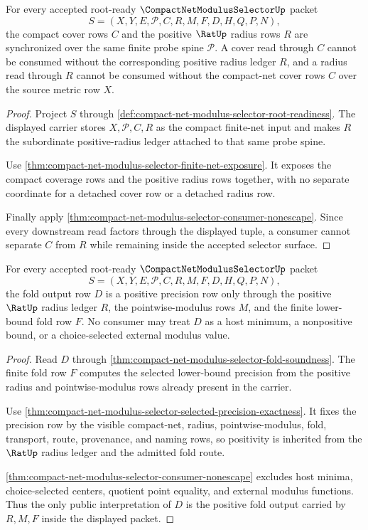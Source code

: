 \begin{theorem}
\label{thm:compact-net-modulus-selector-cover-radius-synchronization}
For every accepted root-ready $\CompactNetModulusSelectorUp$ packet
$$
S=(X,Y,E,\mathcal{P},C,R,M,F,D,H,Q,P,N),
$$
the compact cover rows $C$ and the positive $\RatUp$ radius rows $R$ are synchronized over the same finite probe spine $\mathcal{P}$. A cover read through $C$ cannot be consumed without the corresponding positive radius ledger $R$, and a radius read through $R$ cannot be consumed without the compact-net cover rows $C$ over the source metric row $X$.
\end{theorem}
\begin{proof}
Project $S$ through \autoref{def:compact-net-modulus-selector-root-readiness}. The displayed carrier stores $X,\mathcal{P},C,R$ as the compact finite-net input and makes $R$ the subordinate positive-radius ledger attached to that same probe spine.

Use \autoref{thm:compact-net-modulus-selector-finite-net-exposure}. It exposes the compact coverage rows and the positive radius rows together, with no separate coordinate for a detached cover row or a detached radius row.

Finally apply \autoref{thm:compact-net-modulus-selector-consumer-nonescape}. Since every downstream read factors through the displayed tuple, a consumer cannot separate $C$ from $R$ while remaining inside the accepted selector surface.
\end{proof}

\begin{theorem}
\label{thm:compact-net-modulus-selector-fold-output-positivity}
For every accepted root-ready $\CompactNetModulusSelectorUp$ packet
$$
S=(X,Y,E,\mathcal{P},C,R,M,F,D,H,Q,P,N),
$$
the fold output row $D$ is a positive precision row only through the positive $\RatUp$ radius ledger $R$, the pointwise-modulus rows $M$, and the finite lower-bound fold row $F$. No consumer may treat $D$ as a host minimum, a nonpositive bound, or a choice-selected external modulus value.
\end{theorem}
\begin{proof}
Read $D$ through \autoref{thm:compact-net-modulus-selector-fold-soundness}. The finite fold row $F$ computes the selected lower-bound precision from the positive radius and pointwise-modulus rows already present in the carrier.

Use \autoref{thm:compact-net-modulus-selector-selected-precision-exactness}. It fixes the precision row by the visible compact-net, radius, pointwise-modulus, fold, transport, route, provenance, and naming rows, so positivity is inherited from the $\RatUp$ radius ledger and the admitted fold route.

\autoref{thm:compact-net-modulus-selector-consumer-nonescape} excludes host minima, choice-selected centers, quotient point equality, and external modulus functions. Thus the only public interpretation of $D$ is the positive fold output carried by $R,M,F$ inside the displayed packet.
\end{proof}

